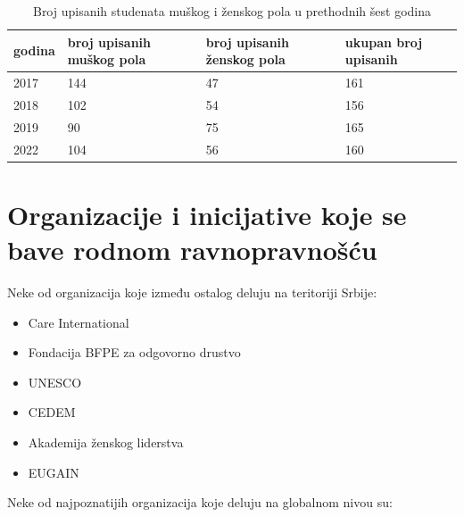 \documentclass[a4paper]{article}
\begin{document}
{
\centering
\begin{table}[h!]
\caption{Broj upisanih studenata muškog i ženskog pola u prethodnih šest godina}

\begin{tabular}{|p{2cm}|p{2cm}|p{2cm}|p{2cm}|} \hline
godina&broj upisanih muškog pola& broj upisanih ženskog pola & ukupan broj upisanih\\ \hline
2017&144&47&161\\ \hline
2018&102&54&156\\ \hline
2019&90&75&165\\ \hline
2022&104&56&160\\ \hline


\end{tabular}
\label{tab:tabela1}
\end{table}
}





\newpage


\section{Organizacije i inicijative koje se bave rodnom ravnopravnošću}

Neke od organizacija koje između ostalog deluju na teritoriji Srbije:
\begin{itemize}
\item Care International
\item Fondacija BFPE za odgovorno drustvo
\item UNESCO
\item CEDEM
\item Akademija ženskog liderstva
\item EUGAIN
\end{itemize}
Neke od najpoznatijih organizacija koje deluju na globalnom nivou su:
\end{document}
